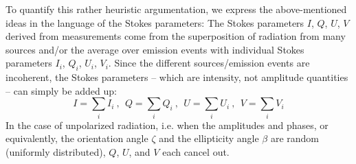 To quantify this rather heuristic argumentation, we express the
above-mentioned ideas in the language of the Stokes parameters: The
Stokes parameters $I$, $Q$, $U$, $V$ derived from measurements come
from the superposition of radiation from many sources and/or the
average over emission events with individual Stokes parameters $I_i$,
$Q_i$, $U_i$, $V_i$.  Since the different sources/emission events are
incoherent, the Stokes parameters -- which are intensity, not
amplitude quantities -- can simply be added up:
\begin{equation}
  \label{eq:polarization:summed_stokes}
  I = \sum_i I_i \: \mbox{, }\; 
  Q = \sum_i Q_i \: \mbox{, }\; 
  U = \sum_i U_i \: \mbox{, }\; 
  V = \sum_i V_i
\end{equation}
In the case of unpolarized radiation, i.e. when the amplitudes and
phases, or equivalently, the orientation angle $\zeta$ and the
ellipticity angle $\beta$ are random (uniformly distributed), 
$Q$, $U$, and $V$
each cancel out.

